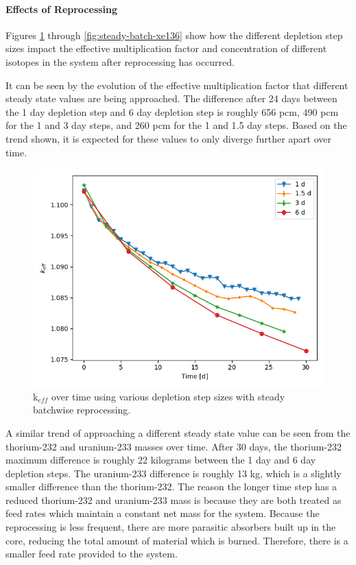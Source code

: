 \paragraph{Effects of Reprocessing}

Figures \ref{fig:steady-batch-k} through \ref{fig:steady-batch-xe136} show how the different depletion step sizes impact the effective multiplication factor and concentration of different isotopes in the system after reprocessing has occurred.

It can be seen by the evolution of the effective multiplication factor that different steady state values are being approached. The difference after 24 days between the 1 day depletion step and 6 day depletion step is roughly 656 pcm, 490 pcm for the 1 and 3 day steps, and 260 pcm for the 1 and 1.5 day steps. Based on the trend shown, it is expected for these values to only diverge further apart over time.

\begin{figure}[H]
  \centering
  \includegraphics[scale=0.7]{images/keff-batch-dep-refine.png}
  \caption{k$_{eff}$ over time using various depletion step sizes with steady batchwise reprocessing.}
   \label{fig:steady-batch-k}
\end{figure}

A similar trend of approaching a different steady state value can be seen from the thorium-232 and uranium-233 masses over time. After 30 days, the thorium-232 maximum difference is roughly 22 kilograms between the 1 day and 6 day depletion steps. The uranium-233 difference is roughly 13 kg, which is a slightly smaller difference than the thorium-232. The reason the longer time step has a reduced thorium-232 and uranium-233 mass is because they are both treated as feed rates which maintain a constant net mass for the system. Because the reprocessing is less frequent, there are more parasitic absorbers built up in the core, reducing the total amount of material which is burned. Therefore, there is a smaller feed rate provided to the system.

